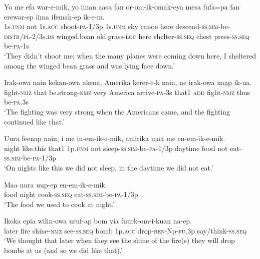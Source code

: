 \ea
\gll  Yo  me  efa  war-e-mik,  yo  iinan  aasa  fan or-om-ik-omak-eya  mesa  fufa=pa  fan  erewar-ep  iima  ifemak-ep  ik-e-m. \\
1s.\textsc{unm}  not  1s.\textsc{acc}  shoot-\textsc{pa}-1/3p  1s.\textsc{unm}  sky  canoe  here descend-\textsc{ss}.\textsc{sim}-be-\textsc{distr}/\textsc{pl}-2/3s.\textsc{ds}  winged.bean  old.grass-\textsc{loc} here  shelter-\textsc{ss.seq}  chest  press-\textsc{ss.seq}  be-\textsc{pa}-1s \\
\glt ‘They didn’t shoot me; when the many planes were coming down here, I sheltered among the winged bean grass and was lying face down.’ \\
\z


\ea
\gll  Irak-owa  nain  kekan-owa  akena,  Amerika  kerer-e-k  nain,  ne  irak-owa  naap  ik-ua. \\
fight-\textsc{nmz}  that  be.strong-\textsc{nmz}  very  America  arrive-\textsc{pa}-3s  that1 \textsc{add}  fight-\textsc{nmz}  thus  be-\textsc{pa}.3s \\
\glt ‘The fighting was very strong when the Americans came, and the fighting continued like that.’ \\
\z


\ea
\gll  Uura  feenap  nain,  i  me  in-em-ik-e-mik,  amirika maa  me  en-em-ik-e-mik. \\
night  like.this  that1  1p.\textsc{unm}  not  sleep-\textsc{ss}.\textsc{sim}-be-\textsc{pa}-1/3p  daytime   food  not  eat-\textsc{ss}.\textsc{sim}-be-\textsc{pa}-1/3p\\
\glt ‘On nights like this we did not sleep, in the daytime we did not eat.’ \\
\z


\ea
\gll  Maa  uura  uup-ep  en-em-ik-e-mik. \\
food  night  cook-\textsc{ss.seq}  eat-\textsc{ss}.\textsc{sim}-be-\textsc{pa}-1/3p \\
\glt ‘The food we used to cook at night.’ \\
\z


\ea
\gll  Ikoka  epia  wilin-owa  uruf-ap  bom  yia   fuurk-om-i-kuan  na-ep. \\
later  fire  shine-\textsc{nmz}  see-\textsc{ss.seq}  bomb  1p.\textsc{acc}  drop-\textsc{ben}-Np-\textsc{fu}.3p  say/think-\textsc{ss.seq} \\ 
\glt ‘We thought that later when they see the shine of the fire(s) they will drop bombs at us (and so we did like that).’ \\
\z


